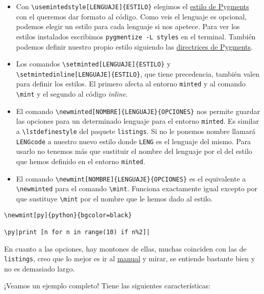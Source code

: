 \begin{itemize}
\item
  Con \lstinline!\usemintedstyle[LENGUAJE]{ESTILO}! elegimos el
  \href{https://help.farbox.com/pygments.html}{estilo de Pygments} con
  el queremos dar formato al código. Como veis el lenguaje es opcional,
  podemos elegir un estilo para cada lenguaje si nos apetece. Para ver
  los estilos instalados escribimos \lstinline!pygmentize -L styles! en
  el terminal. También podemos definir nuestro propio estilo siguiendo
  las \href{http://pygments.org/docs/styles/}{directrices de Pygments}.
\item
  Los comandos \lstinline!\setminted[LENGUAJE]{ESTILO}! y
  \lstinline!\setmintedinline[LENGUAJE]{ESTILO}!, que tiene precedencia,
  también valen para definir los estilos. El primero afecta al entorno
  \lstinline!minted! y al comando \lstinline!\mint! y el segundo al
  código \emph{inline}.
\item
  El comando \lstinline!\newminted[NOMBRE]{LENGUAJE}{OPCIONES}! nos
  permite guardar las opciones para un determinado lenguaje para el
  entorno \lstinline!minted!. Es similar a \lstinline!\lstdefinestyle!
  del paquete \lstinline!listings!. Si no le ponemos nombre llamará
  \lstinline!LENGcode! a nuestro nuevo estilo donde \lstinline!LENG! es
  el lenguaje del mismo. Para usarlo no tenemos más que sustituir el
  nombre del lenguaje por el del estilo que hemos definido en el entorno
  \lstinline!minted!.
\item
  El comando \lstinline!\newmint[NOMBRE]{LENGUAJE}{OPCIONES}! es el
  equivalente a \lstinline!\newminted! para el comando
  \lstinline!\mint!. Funciona exactamente igual excepto por que
  sustituye \lstinline!\mint! por el nombre que le hemos dado al estilo.
\end{itemize}

\begin{lstlisting}[language={[latex]tex}]
\newmint[py]{python}{bgcolor=black}

\py|print [n for n in range(10) if n%2]|
\end{lstlisting}

En cuanto a las opciones, hay montones de ellas, muchas coinciden con
las de \lstinline!listings!, creo que lo mejor es ir al
\href{http://osl.ugr.es/CTAN/macros/latex/contrib/minted/minted.pdf}{manual}
y mirar, se entiende bastante bien y no es demasiado largo.

¡Veamos un ejemplo completo! Tiene las siguientes características:

